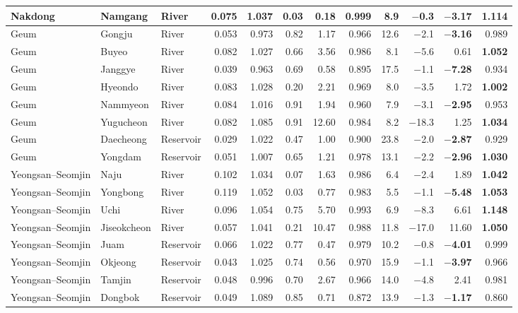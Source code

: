 \begin{table}[tbp]
\begin{adjustbox}{max width=\textwidth}
\begin{tabular}{lllrrrrrrrrr}
Nakdong & Namgang & River & 0.075 & 1.037 & 0.03 & 0.18 & 0.999 & 8.9 & $-$0.3 & \textbf{$-$3.17} & \textbf{1.114} \\
\midrule
Geum & Gongju & River & 0.053 & 0.973 & 0.82 & 1.17 & 0.966 & 12.6 & $-$2.1 & \textbf{$-$3.16} & 0.989 \\
Geum & Buyeo & River & 0.082 & 1.027 & 0.66 & 3.56 & 0.986 & 8.1 & $-$5.6 & 0.61 & \textbf{1.052} \\
Geum & Janggye & River & 0.039 & 0.963 & 0.69 & 0.58 & 0.895 & 17.5 & $-$1.1 & \textbf{$-$7.28} & 0.934 \\
Geum & Hyeondo & River & 0.083 & 1.028 & 0.20 & 2.21 & 0.969 & 8.0 & $-$3.5 & 1.72 & \textbf{1.002} \\
Geum & Nammyeon & River & 0.084 & 1.016 & 0.91 & 1.94 & 0.960 & 7.9 & $-$3.1 & \textbf{$-$2.95} & 0.953 \\
Geum & Yugucheon & River & 0.082 & 1.085 & 0.91 & 12.60 & 0.984 & 8.2 & $-$18.3 & 1.25 & \textbf{1.034} \\
Geum & Daecheong & Reservoir & 0.029 & 1.022 & 0.47 & 1.00 & 0.900 & 23.8 & $-$2.0 & \textbf{$-$2.87} & 0.929 \\
Geum & Yongdam & Reservoir & 0.051 & 1.007 & 0.65 & 1.21 & 0.978 & 13.1 & $-$2.2 & \textbf{$-$2.96} & \textbf{1.030} \\
\midrule
Yeongsan--Seomjin & Naju & River & 0.102 & 1.034 & 0.07 & 1.63 & 0.986 & 6.4 & $-$2.4 & 1.89 & \textbf{1.042} \\
Yeongsan--Seomjin & Yongbong & River & 0.119 & 1.052 & 0.03 & 0.77 & 0.983 & 5.5 & $-$1.1 & \textbf{$-$5.48} & \textbf{1.053} \\
Yeongsan--Seomjin & Uchi & River & 0.096 & 1.054 & 0.75 & 5.70 & 0.993 & 6.9 & $-$8.3 & 6.61 & \textbf{1.148} \\
Yeongsan--Seomjin & Jiseokcheon & River & 0.057 & 1.041 & 0.21 & 10.47 & 0.988 & 11.8 & $-$17.0 & 11.60 & \textbf{1.050} \\
Yeongsan--Seomjin & Juam & Reservoir & 0.066 & 1.022 & 0.77 & 0.47 & 0.979 & 10.2 & $-$0.8 & \textbf{$-$4.01} & 0.999 \\
Yeongsan--Seomjin & Okjeong & Reservoir & 0.043 & 1.025 & 0.74 & 0.56 & 0.970 & 15.9 & $-$1.1 & \textbf{$-$3.97} & 0.966 \\
Yeongsan--Seomjin & Tamjin & Reservoir & 0.048 & 0.996 & 0.70 & 2.67 & 0.966 & 14.0 & $-$4.8 & 2.41 & 0.981 \\
Yeongsan--Seomjin & Dongbok & Reservoir & 0.049 & 1.089 & 0.85 & 0.71 & 0.872 & 13.9 & $-$1.3 & \textbf{$-$1.17} & 0.860 \\
\bottomrule
\end{tabular}
\end{adjustbox}
\end{table}
